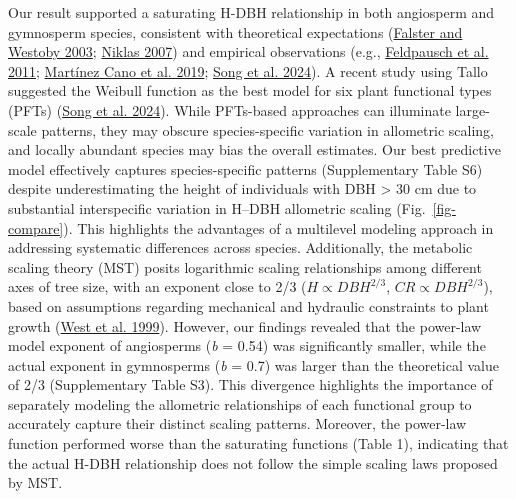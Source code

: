\documentclass[
  12pt,
  letterpaper,
  DIV=11,
  numbers=noendperiod]{scrartcl}
\begin{document}
Our result supported a saturating H-DBH relationship in both angiosperm
and gymnosperm species, consistent with theoretical expectations
(\protect\hyperlink{ref-Falster2003}{Falster and Westoby 2003};
\protect\hyperlink{ref-Niklas2007}{Niklas 2007}) and empirical
observations (e.g., \protect\hyperlink{ref-Feldpausch2011}{Feldpausch et
al. 2011}; \protect\hyperlink{ref-MartinezCano2019}{Martínez Cano et al.
2019}; \protect\hyperlink{ref-Song2024}{Song et al. 2024}). A recent
study using Tallo suggested the Weibull function as the best model for
six plant functional types (PFTs) (\protect\hyperlink{ref-Song2024}{Song
et al. 2024}). While PFTs-based approaches can illuminate large-scale
patterns, they may obscure species-specific variation in allometric
scaling, and locally abundant species may bias the overall estimates.
Our best predictive model effectively captures species-specific patterns
(Supplementary Table S6) despite underestimating the height of
individuals with DBH \textgreater{} 30 cm due to substantial
interspecific variation in H--DBH allometric scaling
(Fig.~\ref{fig-compare}). This highlights the advantages of a multilevel
modeling approach in addressing systematic differences across species.
Additionally, the metabolic scaling theory (MST) posits logarithmic
scaling relationships among different axes of tree size, with an
exponent close to 2/3 (\(H \propto DBH^{2/3}\),
\(CR \propto DBH^{2/3}\)), based on assumptions regarding mechanical and
hydraulic constraints to plant growth
(\protect\hyperlink{ref-West1999}{West et al. 1999}). However, our
findings revealed that the power-law model exponent of angiosperms
(\emph{b} = 0.54) was significantly smaller, while the actual exponent
in gymnosperms (\emph{b} = 0.7) was larger than the theoretical value of
2/3 (Supplementary Table S3). This divergence highlights the importance
of separately modeling the allometric relationships of each functional
group to accurately capture their distinct scaling patterns. Moreover,
the power-law function performed worse than the saturating functions
(Table 1), indicating that the actual H-DBH relationship does not follow
the simple scaling laws proposed by MST.
\end{document}
